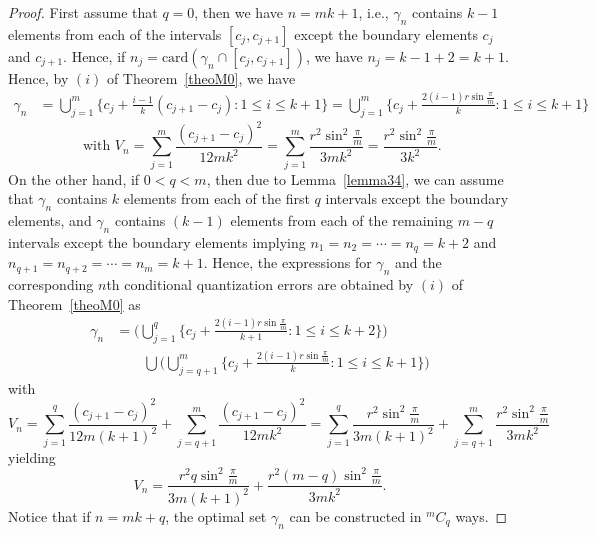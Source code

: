 \documentclass[10pt,a4paper]{amsart}
\newcommand{\UU}{\bigcup}%
\newcommand{\ii}{\cap}%
\newcommand{\te}{\text}%
\renewcommand{\gg}{\gamma}%
\begin{document}
\begin{proof} 
First assume that $q=0$, then we have $n=mk+1$, i.e., $\gg_n$ contains $k-1$ elements from each of the intervals $[c_j, c_{j+1}]$ except the boundary elements $c_j$ and $c_{j+1}$. Hence, if $n_j=\te{card}(\gg_n\ii [c_j, c_{j+1}])$, we have $n_j=k-1+2=k+1$. Hence, by $(i)$ of Theorem~\ref{theoM0}, we have 
\begin{align*}
\gg_n& = \UU_{j=1}^{m}\{c_j+\frac{i-1}{k}(c_{j+1}-c_{j}) : 1\leq i\leq k+1\}=\UU_{j=1}^{m}\{c_j+\frac{2(i-1)r\sin \frac{\pi}m}{k}  : 1\leq i\leq k+1\}
\end{align*}
\[ \te{ with } V_n=\sum_{j=1}^m \frac {(c_{j+1}-c_j)^2}{12mk^2}=\sum_{j=1}^m \frac {r^2 \sin^2\frac{\pi} m}{3mk^2}=\frac {r^2 \sin^2\frac{\pi} m}{3k^2}.\]
On the other hand, if $0<q<m$, then due to Lemma~\ref{lemma34}, we can assume that $\gg_n$ contains $k$ elements from each of the first $q$ intervals except the boundary elements, and $\gg_n$ contains $(k-1)$ elements from each of the remaining $m-q$ intervals except the boundary elements implying $n_1=n_2=\cdots=n_q=k+2$ and $n_{q+1}=n_{q+2}=\cdots=n_m=k+1$. Hence, the expressions for $\gg_n$ and the corresponding $n$th conditional quantization errors  are  obtained by  $(i)$ of Theorem~\ref{theoM0} as 
\begin{align*}
\gg_n  &= \Big(\UU_{j=1}^{q}\{c_j+\frac{2(i-1)r\sin \frac{\pi}m}{k+1} : 1\leq i\leq k+2\}\Big)\\
&\qquad \UU \Big(\UU_{j=q+1}^{m}\{c_j+\frac{2(i-1)r\sin \frac{\pi}m}{k}  : 1\leq i\leq k+1\}\Big)
\end{align*} 
 with  
 \[V_n=\sum_{j=1}^q \frac {(c_{j+1}-c_j)^2}{12 m(k+1)^2}+\sum_{j=q+1}^m \frac {(c_{j+1}-c_j)^2}{12mk^2}=\sum_{j=1}^q \frac {r^2\sin^2\frac{\pi} m}{3m(k+1)^2}+\sum_{j=q+1}^m \frac {r^2\sin^2\frac{\pi} m}{3mk^2}\] 
 yielding \[V_n=\frac {r^2q\sin^2\frac{\pi} m}{3m(k+1)^2}+ \frac {r^2(m-q)\sin^2\frac{\pi} m}{3mk^2}.\]
 Notice that if $n=mk+q$, the optimal set $\gg_n$ can be constructed in $^mC_q$ ways. 
\end{proof} 
\end{document}
